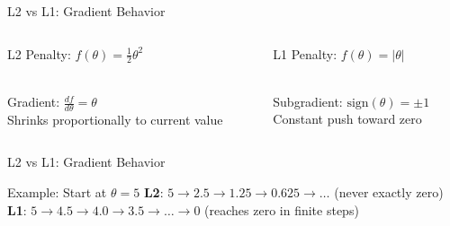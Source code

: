 \documentclass{beamer}
\begin{document}
\begin{frame}{L2 vs L1: Gradient Behavior}
\begin{columns}
\begin{column}{0.5\textwidth}
\begin{keypointsbox}{L2 Penalty: $f(\theta) = \frac{1}{2}\theta^2$}
\\[0.3em]
{\small Gradient: $\frac{df}{d\theta} = \theta$ \\[0.1em]
Shrinks proportionally to current value}
\end{keypointsbox}
\end{column}


\begin{column}{0.5\textwidth}
\begin{keypointsbox}{L1 Penalty: $f(\theta) = |\theta|$}
\\[0.3em]
{\small Subgradient: $\text{sign}(\theta) = \pm 1$ \\[0.1em]
Constant push toward zero}
\end{keypointsbox}
\end{column}
\end{columns}
\end{frame}

\begin{frame}{L2 vs L1: Gradient Behavior}

\begin{examplebox}{Example: Start at $\theta = 5$}
{\small
\textbf{L2}: $5 \to 2.5 \to 1.25 \to 0.625 \to \ldots$ (never exactly zero) \\[0.1em]
\textbf{L1}: $5 \to 4.5 \to 4.0 \to 3.5 \to \ldots \to 0$ (reaches zero in finite steps)
}
\end{examplebox}
\end{frame}
\end{document}
